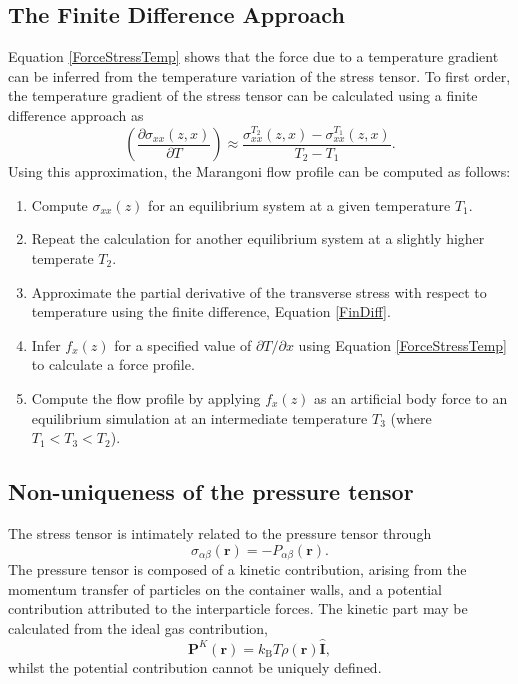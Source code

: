 \subsection{The Finite Difference Approach}
Equation \ref{ForceStressTemp} shows that the force due to a temperature gradient can be inferred from the temperature variation of the stress tensor. 
To first order, the temperature gradient of the stress tensor can be calculated using a finite difference approach as
\begin{equation}
\label{FinDiff}
\left( \frac{\partial \sigma_{xx}(z,x)}{\partial T} \right) \approx \frac{\sigma_{xx}^{T_{2}}(z,x) - \sigma_{xx}^{T_{1}}(z,x)}{T_{2} - T_{1}}.
\end{equation}
Using this approximation, the Marangoni flow profile can be computed as follows:
\begin{enumerate}
	\item Compute $\sigma_{xx}(z)$ for an equilibrium system at a given temperature $T_{1}$.
	\item Repeat the calculation for another equilibrium system at a slightly higher temperate $T_{2}$.
	\item Approximate the partial derivative of the transverse stress with respect to temperature using the finite difference, Equation \ref{FinDiff}.
	\item Infer $f_{x}(z)$ for a specified value of $\partial T / \partial x$ using Equation \ref{ForceStressTemp} to calculate a force profile.
	\item Compute the flow profile by applying $f_{x}(z)$ as an artificial body force to an equilibrium simulation at an intermediate temperature $T_{3}$ (where $T_{1} < T_{3} < T_{2}$).
\end{enumerate}

\subsection{Non-uniqueness of the pressure tensor}
The stress tensor is intimately related to the pressure tensor through
\begin{equation}
\sigma_{\alpha \beta}(\mathbf{r}) = - P_{\alpha \beta} (\mathbf{r}).
\end{equation}
The pressure tensor is composed of a kinetic contribution, arising from the momentum transfer of particles on the container walls, and a potential contribution attributed to the interparticle forces.\cite{VarnikBinder}
The kinetic part may be calculated from the ideal gas contribution,
\begin{equation}
\mathbf{P}^{K}(\mathbf{r})=k_{\mathrm{B}} T \rho(\mathbf{r}) \hat{\mathbf{I}},
\end{equation}
whilst the potential contribution cannot be uniquely defined.

